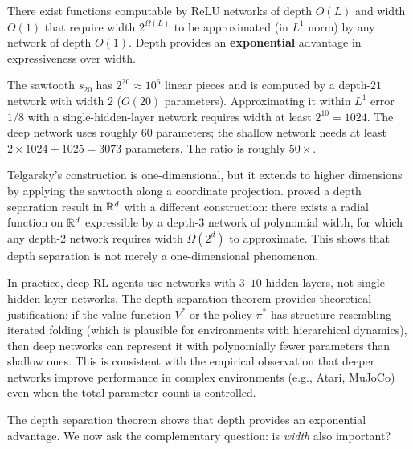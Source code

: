 \documentclass[11pt,a4paper]{article}
\begin{document}
\begin{keyresult}[title={Telgarsky's Depth Separation}]
There exist functions computable by ReLU networks of depth $O(L)$ and
width $O(1)$ that require width $2^{\Omega(L)}$ to be approximated
(in $L^1$ norm) by any network of depth $O(1)$.  Depth provides an
\textbf{exponential} advantage in expressiveness over width.
\end{keyresult}

\begin{example}
\label{ex:depth-comparison}
The sawtooth $s_{20}$ has $2^{20} \approx 10^6$ linear pieces and is
computed by a depth-$21$ network with width $2$ ($O(20)$ parameters).
Approximating it within $L^1$ error $1/8$ with a single-hidden-layer
network requires width at least $2^{10} = 1024$.  The deep network
uses roughly $60$ parameters; the shallow network needs at least
$2 \times 1024 + 1025 = 3073$ parameters.  The ratio is roughly
$50{\times}$.
\end{example}

\begin{example}
\label{ex:higher-dim}
Telgarsky's construction is one-dimensional, but it extends to higher
dimensions by applying the sawtooth along a coordinate projection.
\citet{eldan2016} proved a depth separation result in $\mathbb{R}^d$ with
a different construction: there exists a radial function on $\mathbb{R}^d$
expressible by a depth-3 network of polynomial width, for which any
depth-2 network requires width $\Omega(2^d)$ to approximate.  This
shows that depth separation is not merely a one-dimensional phenomenon.
\end{example}

\begin{rlconnection}[title={Depth Separation and RL Architectures}]
In practice, deep RL agents use networks with $3$--$10$ hidden layers,
not single-hidden-layer networks.  The depth separation theorem
provides theoretical justification: if the value function $V^*$ or
the policy $\pi^*$ has structure resembling iterated folding (which is
plausible for environments with hierarchical dynamics), then deep
networks can represent it with polynomially fewer parameters than
shallow ones.  This is consistent with the empirical observation that
deeper networks improve performance in complex environments (e.g.,
Atari, MuJoCo) even when the total parameter count is controlled.
\end{rlconnection}

The depth separation theorem shows that depth provides an exponential
advantage.  We now ask the complementary question: is \emph{width}
also important?
\end{document}

